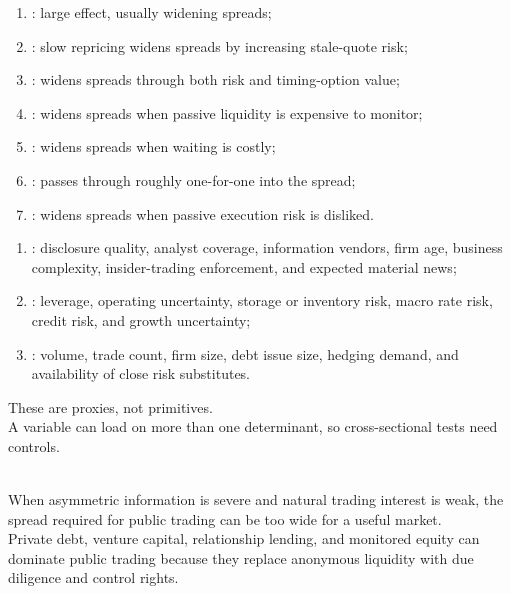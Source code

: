 \documentclass[a4paper,oneside,openany]{book}
\begin{document}
\begin{taxonomy} 
\begin{enumerate}[label=\roman*.]
\setlength{\itemsep}{0pt}
\item {}: large effect, usually widening spreads;
\item {}: slow repricing widens spreads by increasing stale-quote risk;
\item {}: widens spreads through both risk and timing-option value;
\item {}: widens spreads when passive liquidity is expensive to monitor;
\item {}: widens spreads when waiting is costly;
\item {}: passes through roughly one-for-one into the spread;
\item {}: widens spreads when passive execution risk is disliked.
\end{enumerate}
\end{taxonomy}

\begin{taxonomy} 
\begin{enumerate}[label=\roman*.]
\setlength{\itemsep}{0pt}
\item {}: disclosure quality, analyst coverage, information vendors, firm age, business complexity, insider-trading enforcement, and expected material news;
\item {}: leverage, operating uncertainty, storage or inventory risk, macro rate risk, credit risk, and growth uncertainty;
\item {}: volume, trade count, firm size, debt issue size, hedging demand, and availability of close risk substitutes.
\end{enumerate}
These are proxies, not primitives.\\
A variable can load on more than one determinant, so cross-sectional tests need controls.
\end{taxonomy}

\begin{caveat} \\
When asymmetric information is severe and natural trading interest is weak, the spread required for public trading can be too wide for a useful market.\\
Private debt, venture capital, relationship lending, and monitored equity can dominate public trading because they replace anonymous liquidity with due diligence and control rights.
\end{caveat}
\end{document}
